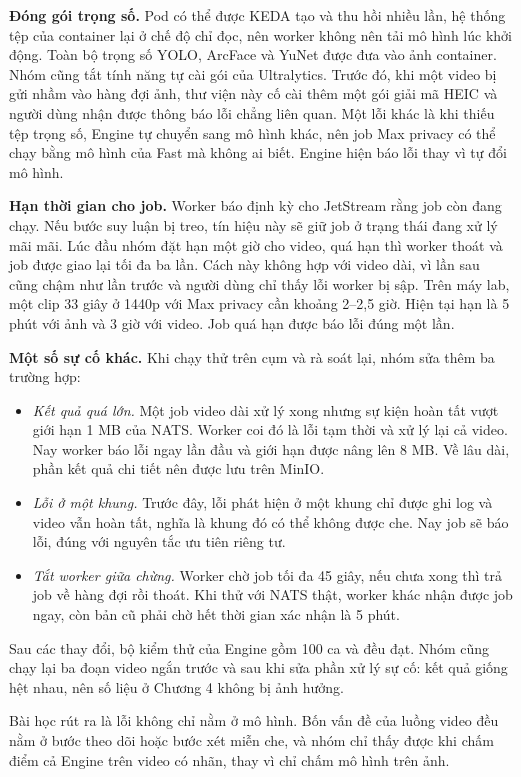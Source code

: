 \textbf{Đóng gói trọng số.} Pod có thể được KEDA tạo và thu hồi nhiều lần, hệ thống tệp của container lại ở chế độ chỉ đọc, nên worker không nên tải mô hình lúc khởi động. Toàn bộ trọng số YOLO, ArcFace và YuNet được đưa vào ảnh container. Nhóm cũng tắt tính năng tự cài gói của Ultralytics. Trước đó, khi một video bị gửi nhầm vào hàng đợi ảnh, thư viện này cố cài thêm một gói giải mã HEIC và người dùng nhận được thông báo lỗi chẳng liên quan. Một lỗi khác là khi thiếu tệp trọng số, Engine tự chuyển sang mô hình khác, nên job Max privacy có thể chạy bằng mô hình của Fast mà không ai biết. Engine hiện báo lỗi thay vì tự đổi mô hình.

\textbf{Hạn thời gian cho job.} Worker báo định kỳ cho JetStream rằng job còn đang chạy. Nếu bước suy luận bị treo, tín hiệu này sẽ giữ job ở trạng thái đang xử lý mãi mãi. Lúc đầu nhóm đặt hạn một giờ cho video, quá hạn thì worker thoát và job được giao lại tối đa ba lần. Cách này không hợp với video dài, vì lần sau cũng chậm như lần trước và người dùng chỉ thấy lỗi worker bị sập. Trên máy lab, một clip 33 giây ở 1440p với Max privacy cần khoảng 2--2,5 giờ. Hiện tại hạn là 5 phút với ảnh và 3 giờ với video. Job quá hạn được báo lỗi  đúng một lần.

\textbf{Một số sự cố khác.} Khi chạy thử trên cụm và rà soát lại, nhóm sửa thêm ba trường hợp:
\begin{itemize}
  \item \textit{Kết quả quá lớn.} Một job video dài xử lý xong nhưng sự kiện hoàn tất vượt giới hạn 1 MB của NATS. Worker coi đó là lỗi tạm thời và xử lý lại cả video. Nay worker báo lỗi ngay lần đầu và giới hạn được nâng lên 8 MB. Về lâu dài, phần kết quả chi tiết nên được lưu trên MinIO.
  \item \textit{Lỗi ở một khung.} Trước đây, lỗi phát hiện ở một khung chỉ được ghi log và video vẫn hoàn tất, nghĩa là khung đó có thể không được che. Nay job sẽ báo lỗi, đúng với nguyên tắc ưu tiên riêng tư.
  \item \textit{Tắt worker giữa chừng.} Worker chờ job tối đa 45 giây, nếu chưa xong thì trả job về hàng đợi rồi thoát. Khi thử với NATS thật, worker khác nhận được job ngay, còn bản cũ phải chờ hết thời gian xác nhận là 5 phút.
\end{itemize}

Sau các thay đổi, bộ kiểm thử của Engine gồm 100 ca và đều đạt. Nhóm cũng chạy lại ba đoạn video ngắn trước và sau khi sửa phần xử lý sự cố: kết quả giống hệt nhau, nên số liệu ở Chương 4 không bị ảnh hưởng.

Bài học rút ra là lỗi không chỉ nằm ở mô hình. Bốn vấn đề của luồng video đều nằm ở bước theo dõi hoặc bước xét miễn che, và nhóm chỉ thấy được khi chấm điểm cả Engine trên video có nhãn, thay vì chỉ chấm mô hình trên ảnh.
